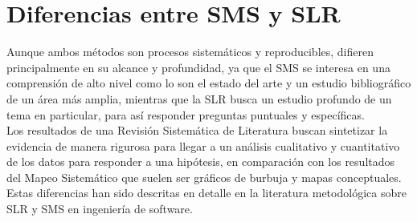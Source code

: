 \section{Diferencias entre SMS y SLR}

Aunque ambos métodos son procesos sistemáticos y reproducibles, difieren principalmente en su alcance y profundidad, ya que el SMS se interesa en una comprensión de alto nivel como lo son el estado del arte y un estudio bibliográfico de un área más amplia, mientras que la SLR busca un estudio profundo de un tema en particular, para así responder preguntas puntuales y específicas.\\
Los resultados de una Revisión Sistemática de Literatura buscan sintetizar la evidencia de manera rigurosa para llegar a un análisis cualitativo y cuantitativo de los datos para responder a una hipótesis, en comparación con los resultados del Mapeo Sistemático que suelen ser gráficos de burbuja y mapas conceptuales.\\
Estas diferencias han sido descritas en detalle en la literatura metodológica sobre SLR y SMS en ingeniería de software. \cite{kitchenham2009slr}\\

